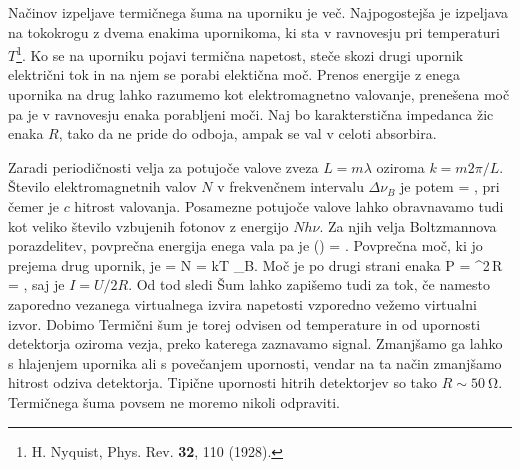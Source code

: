 Načinov izpeljave termičnega šuma na uporniku je več. Najpogostejša 
je izpeljava na tokokrogu z dvema enakima upornikoma, ki sta v ravnovesju
pri temperaturi $T$\footnote{H. Nyquist, Phys. Rev. {\bf 32}, 110 (1928).}. 
Ko se na uporniku pojavi termična napetost, steče skozi drugi upornik električni 
tok in na njem se porabi elektična moč. Prenos energije z enega upornika
na drug lahko razumemo kot elektromagnetno valovanje, prenešena moč pa
je v ravnovesju enaka porabljeni moči. Naj bo karakterstična impedanca
žic enaka $R$, tako da ne pride do odboja, ampak se val v celoti absorbira.

Zaradi periodičnosti velja za potujoče valove zveza $L = m \lambda$
oziroma $k = m 2\pi/L$. Število elektromagnetnih valov $N$ v frekvenčnem intervalu 
$\Delta\nu_B$ je potem 
\beq
{} = ,
\eeq
pri čemer je $c$ hitrost valovanja. Posamezne potujoče valove lahko obravnavamo
tudi kot veliko število vzbujenih fotonov z energijo $Nh\nu$. Za njih velja Boltzmannova
porazdelitev, povprečna energija enega vala pa je 
\beq
{}(\nu) = .
\eeq
Povprečna moč, ki jo prejema drug upornik, je
\beq
{} = N = 
\approx kT \Delta \nu_B.
\eeq
Moč je po drugi strani enaka
\beq
P = ^2\,R = ,
\eeq
saj je $I=U/2R$. Od tod sledi
Šum lahko zapišemo tudi za tok, če namesto zaporedno vezanega virtualnega 
izvira napetosti vzporedno vežemo virtualni izvor. Dobimo
Termični šum je torej odvisen od temperature in od upornosti detektorja oziroma
vezja, preko katerega zaznavamo signal. Zmanjšamo ga lahko s hlajenjem upornika
ali s povečanjem upornosti, vendar na ta način zmanjšamo hitrost odziva detektorja. 
Tipične upornosti hitrih detektorjev so tako $R \sim 50~\si{\ohm}$. Termičnega
šuma povsem ne moremo nikoli odpraviti. 

